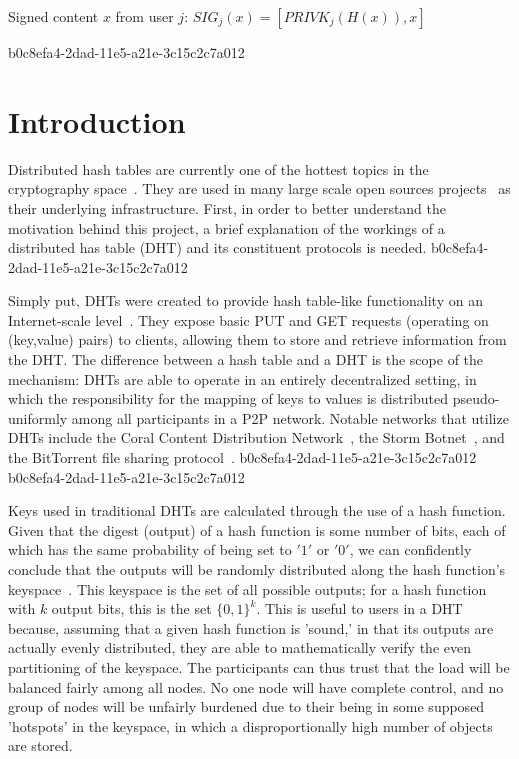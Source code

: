 \documentclass[12pt]{article}
\begin{document}
Signed content $x$ from user $j$: $SIG_j(x) = \left[ PRIVK_j( H(x) ), x \right]$

b0c8efa4-2dad-11e5-a21e-3c15c2c7a012\section{Introduction}
\par Distributed hash tables are currently one of the hottest topics in the cryptography space~\cite{Stoica:2001dj,Rowstron:2001ea,Ratnasamy:2001wn}. They are used in many large scale open sources projects~\cite{Freitas:2013tb,Xu:2010vs,Perfitt:2010fh} as their underlying infrastructure. First, in order to better understand the motivation behind this project, a brief explanation of the workings of a distributed has table (DHT) and its constituent protocols is needed.
b0c8efa4-2dad-11e5-a21e-3c15c2c7a012
\par Simply put, DHTs were created to provide hash table-like functionality on an Internet-scale level~\cite{Ratnasamy:2001wn}. They expose basic PUT and GET requests (operating on (key,value) pairs) to clients, allowing them to store and retrieve information from the DHT. The difference between a hash table and a DHT is the scope of the mechanism: DHTs are able to operate in an entirely decentralized setting, in which the responsibility for the mapping of keys to values is distributed pseudo-uniformly among all participants in a P2P network. Notable networks that utilize DHTs include the Coral Content Distribution Network~\cite{Freedman:2004vb}, the Storm Botnet~\cite{Holz:2008uk}, and the BitTorrent file sharing protocol~\cite{Cohen:y1_8mBnw}.
b0c8efa4-2dad-11e5-a21e-3c15c2c7a012
b0c8efa4-2dad-11e5-a21e-3c15c2c7a012\par Keys used in traditional DHTs are calculated through the use of a hash function. Given that the digest (output) of a hash function is some number of bits, each of which has the same probability of being set to $'1'$ or $'0'$, we can confidently conclude that the outputs will be randomly distributed along the hash function's keyspace~. This keyspace is the set of all possible outputs; for a hash function with $k$ output bits, this is the set $\{0,1\}^k$. This is useful to users in a DHT because, assuming that a given hash function is 'sound,' in that its outputs are actually evenly distributed, they are able to mathematically verify the even partitioning of the keyspace. The participants can thus trust that the load will be balanced fairly among all nodes. No one node will have complete control, and no group of nodes will be unfairly burdened due to their being in some supposed 'hotspots' in the keyspace, in which a disproportionally high number of objects are stored.~
\end{document}
